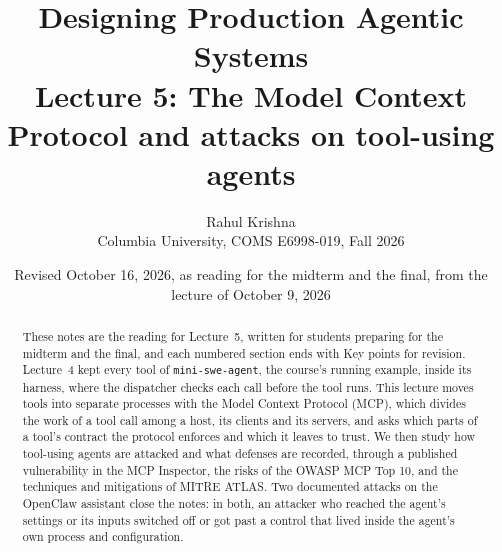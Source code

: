 \documentclass[9pt,twocolumn]{extarticle}
\title{Designing Production Agentic Systems\\Lecture 5: The Model Context Protocol and attacks on tool-using agents}
\author{Rahul Krishna\\Columbia University, COMS E6998-019, Fall 2026}
\date{Revised October 16, 2026, as reading for the midterm and the final, from the lecture of October 9, 2026}
\theoremstyle{definition}
\newcommand{\msa}{\texttt{mini-swe-agent}}     %
\begin{document}
\maketitle
\begin{abstract}
These notes are the reading for Lecture~5, written for students preparing for the midterm and the
final, and each numbered section ends with Key points for revision. Lecture~4 kept every tool of
\msa{}, the course's running example, inside its harness, where the dispatcher checks each call
before the tool runs. This lecture moves tools into separate processes with the Model Context
Protocol (MCP), which divides the work of a tool call among a host, its clients and its servers, and
asks which parts of a tool's contract the protocol enforces and which it leaves to trust. We then
study how tool-using agents are attacked and what defenses are recorded, through a published
vulnerability in the MCP Inspector, the risks of the OWASP MCP Top 10, and the techniques and
mitigations of MITRE ATLAS. Two documented attacks on the OpenClaw assistant close the notes: in
both, an attacker who reached the agent's settings or its inputs switched off or got past a control
that lived inside the agent's own process and configuration.
\end{abstract}
\tableofcontents










\clearpage


\end{document}
